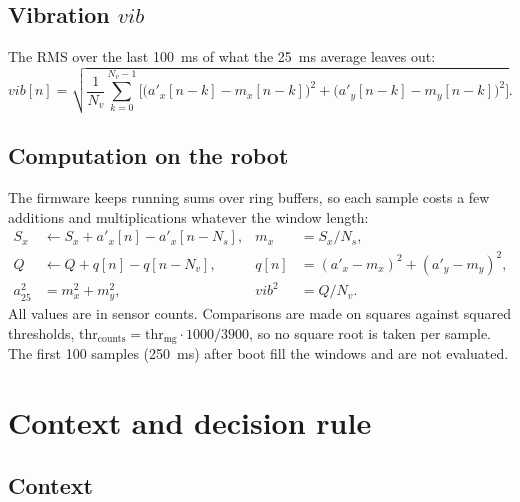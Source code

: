 \documentclass[11pt,a4paper]{article}
\newcommand{\azf}{a_{25}}
\newcommand{\vib}{\mathit{vib}}
\begin{document}
\subsection{Vibration $\vib$}

The RMS over the last \SI{100}{\milli\second} of what the \SI{25}{\milli\second} average leaves
out:
\begin{equation}
  \vib[n] = \sqrt{ \frac{1}{N_v} \sum_{k=0}^{N_v-1}
    \Big[ \big(a'_x[n-k] - m_x[n-k]\big)^2 + \big(a'_y[n-k] - m_y[n-k]\big)^2 \Big] } .
\end{equation}

\subsection{Computation on the robot}

The firmware keeps running sums over ring buffers, so each sample costs a few additions and
multiplications whatever the window length:
\begin{align}
  S_x &\leftarrow S_x + a'_x[n] - a'_x[n-N_s], & m_x &= S_x / N_s, \\
  Q   &\leftarrow Q + q[n] - q[n-N_v], & q[n] &= (a'_x - m_x)^2 + (a'_y - m_y)^2, \\
  \azf^2 &= m_x^2 + m_y^2, & \vib^2 &= Q / N_v .
\end{align}
All values are in sensor counts. Comparisons are made on squares against squared thresholds,
$\text{thr}_\text{counts} = \text{thr}_\text{mg} \cdot 1000 / 3900$, so no square root is taken
per sample. The first 100 samples (\SI{250}{\milli\second}) after boot fill the windows and are not
evaluated.

\section{Context and decision rule}

\subsection{Context}
\end{document}
